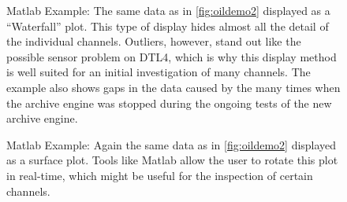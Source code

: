 \begin{figure}[htb]
\begin{center}
\end{center}
\caption{\label{fig:oildemo3}Matlab Example: The same data as
in \ref{fig:oildemo2} displayed as a ``Waterfall'' plot.
This type of display hides almost all the detail of the individual
channels. Outliers, however, stand out like the possible sensor problem
on DTL4, which is why this display method is well suited for an initial
investigation of many channels. The example also shows gaps in the data
caused by the many times when the archive engine was stopped during the
ongoing tests of the new archive engine.
}
\end{figure}

\begin{figure}[htb]
\begin{center}
\end{center}
\caption{\label{fig:oildemo4}Matlab Example: Again the same data as
in \ref{fig:oildemo2} displayed as a surface plot.
Tools like Matlab allow the user to rotate this plot in real-time,
which might be useful for the inspection of certain channels.
}
\end{figure}
